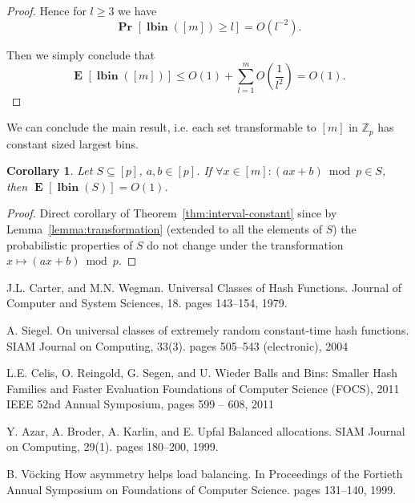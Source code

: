 \documentclass{article}
\newcommand{\vlbin}[1]{\operatorname{\mathbf{lbin}}({#1})}
\newcommand{\probs}[2]{\operatorname{\mathbf{Pr}}_{{#1}}\left[{#2}\right]}
\newcommand{\prob}[1]{\probs{}{#1}}
\newcommand{\expects}[2]{\operatorname{\mathbf{E}}_{{#1}}\left[{#2}\right]}
\newcommand{\expect}[1]{\expects{}{#1}}
\newtheorem{corollary}{Corollary}
\begin{document}
\begin{proof}
Hence for $l \geq 3$ we have
\[
\prob{\vlbin{[m]} \geq l} = O(l^{-2}).
\]

Then we simply conclude that
\[
\expect{\vlbin{[m]}} \leq O(1) + \sum_{l = 1}^m O\left(\frac{1}{l^2}\right) = O(1).
\]

\end{proof}

We can conclude the main result, i.e. each set transformable to $[m]$ in $\mathbb{Z}_p$ has constant sized largest bins.
\begin{corollary}
Let $S \subseteq [p]$, $a, b \in [p]$. 
If $\forall x \in [m] \colon (ax + b) \bmod p \in S$, then $\expect{\vlbin{S}} = O(1)$.
\end{corollary}
\begin{proof}
Direct corollary of Theorem~\ref{thm:interval-constant} since by Lemma~\ref{lemma:transformation} (extended to all the elements of $S$) the probabilistic properties of $S$ do not change under the transformation $x \mapsto (ax + b) \bmod p$.
\end{proof}


\begin{thebibliography}{32}
J.L. Carter, and M.N. Wegman. 
\newblock Universal Classes of Hash Functions.
\newblock Journal of Computer and System Sciences, 18. pages 143--154, 1979.

A. Siegel. 
\newblock On universal classes of extremely random constant-time hash functions.
\newblock SIAM Journal on Computing, 33(3). pages 505--543 (electronic), 2004

L.E. Celis, O. Reingold, G. Segen, and U. Wieder
\newblock Balls and Bins: Smaller Hash Families and Faster Evaluation
\newblock Foundations of Computer Science (FOCS), 2011 IEEE 52nd Annual Symposium, pages 599 -- 608, 2011

Y. Azar, A. Broder, A. Karlin, and E. Upfal
\newblock Balanced allocations.
\newblock SIAM Journal on Computing, 29(1). pages 180--200, 1999.

B. V\"{o}cking
\newblock How asymmetry helps load balancing.
\newblock In Proceedings of the Fortieth Annual Symposium on Foundations of Computer Science. pages 131--140, 1999.
\end{thebibliography}
\end{document}
